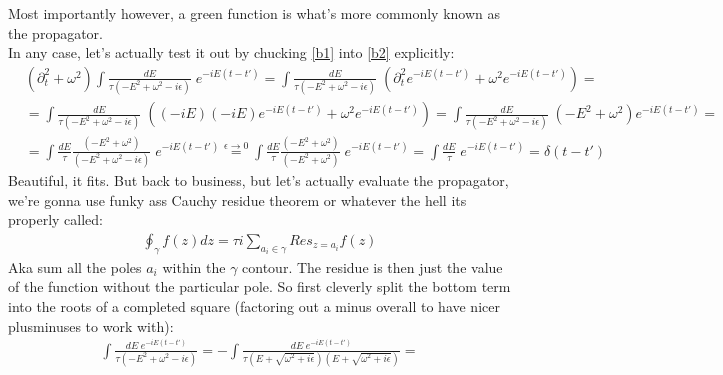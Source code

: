 \documentclass{article}
\begin{document}
Most importantly however, a green function is what's more commonly known as the propagator. \\
In any case, let's actually test it out by chucking \ref{b1} into \ref{b2} explicitly:
\begin{align}
	&(\partial_{t}^2 + \omega^2) \int \frac{dE}{\tau(-E^2+\omega^2-i\epsilon)} \; e^{-iE(t-t')} = \int \frac{dE}{\tau(-E^2+\omega^2-i\epsilon)} \; \left(\partial_{t}^2e^{-iE(t-t')} + \omega^2e^{-iE(t-t')}\right) = \\[1.5ex]
	&= \int \frac{dE}{\tau(-E^2+\omega^2-i\epsilon)} \; \left((-iE)(-iE)e^{-iE(t-t')} + \omega^2e^{-iE(t-t')}\right) = \int \frac{dE}{\tau(-E^2+\omega^2-i\epsilon)} \; \left(-E^2 + \omega^2\right)e^{-iE(t-t')} = \\[1.5ex]
	&=  \int \frac{dE}{\tau} \frac{\left(-E^2 + \omega^2\right)}{(-E^2+\omega^2-i\epsilon)} \; e^{-iE(t-t')}\stackrel{\epsilon \rightarrow 0}{=} \int \frac{dE}{\tau} \frac{\left(-E^2 + \omega^2\right)}{(-E^2+\omega^2)} \; e^{-iE(t-t')} = \int \frac{dE}{\tau} \; e^{-iE(t-t')} = \delta(t-t')
\end{align}
Beautiful, it fits. But back to business, but let's actually evaluate the propagator, we're gonna use funky ass Cauchy residue theorem or whatever the hell its properly called:
\begin{align}
\oint_{\gamma} f(z)dz = \tau i \sum_{a_i \in \gamma} Res_{z=a_i} f(z)
\end{align}
Aka sum all the poles $a_i$ within the $\gamma$ contour. The residue is then just the value of the function without the particular pole. So first cleverly split the bottom term into the roots of a completed square (factoring out a minus overall to have nicer plusminuses to work with):
\begin{align}
	\int \frac{dE\; e^{-iE(t-t')}}{\tau(-E^2+\omega^2-i\epsilon)}  = -\int \frac{dE \; e^{-iE(t-t')}}{\tau\left( E + \sqrt{\omega^2 + i\epsilon}\right)\left( E + \sqrt{\omega^2 + i\epsilon}\right)}=
\end{align}
\end{document}
